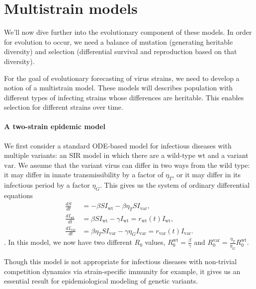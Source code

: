 \section{Multistrain models}

We'll now dive further into the evolutionary component of these models. 
In order for evolution to occur, we need a balance of mutation (generating heritable diversity) and selection (differential survival and reproduction based on that diversity).

For the goal of evolutionary forecasting of virus strains, we need to develop a notion of a multistrain model.
These models will describes population with different types of infecting strains whose differences are heritable.
This enables selection for different strains over time.

\paragraph{A two-strain epidemic model}%


We first consider a standard ODE-based model for infectious diseases with multiple variants: an SIR model in which there are a wild-type $\text{wt}$ and a variant $\text{var}$.
We assume that the variant virus can differ in two ways from the wild type: it may differ in innate transmissibility by a factor of $\eta_{T}$, or it may differ in its infectious period by a factor $\eta_{G}$.
This gives us the system of ordinary differential equations
\begin{align}
    \frac{d S}{d t} &= - \beta S I_{\text{wt}} - \beta \eta_{T} S I_{\text{var}},\\
  \frac{d I_{\text{wt}} }{d t} &= \beta S I_{\text{wt}} - \gamma I_{\text{wt}} = r_{\text{wt}}(t) I_{\text{wt}},\\
  \frac{d I_{\text{var}}}{d t} &= \beta \eta_{T} S I_{\text{var}} - \gamma \eta_{G} I_{\text{var}} = r_{\text{var}}(t) I_{\text{var}}.
\end{align}
.
In this model, we now have two different $R_{0}$ values, $R_{0}^{\text{wt}} = \frac{\beta}{\gamma}$ and $R_{0}^{\text{var}} = \frac{\eta_{T}}{\eta_{G}}R_{0}^{\text{wt}}$.

Though this model is not appropriate for infectious diseases with non-trivial competition dynamics via strain-specific immunity for example, it gives us an essential result for epidemiological modeling of genetic variants. \cite{Gog2002} %

